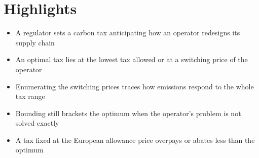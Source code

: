 \documentclass[11pt]{article}
\begin{document}
\section*{Highlights}
\begin{itemize}
\item A regulator sets a carbon tax anticipating how an operator redesigns its supply chain
\item An optimal tax lies at the lowest tax allowed or at a switching price of the operator
\item Enumerating the switching prices traces how emissions respond to the whole tax range
\item Bounding still brackets the optimum when the operator's problem is not solved exactly
\item A tax fixed at the European allowance price overpays or abates less than the optimum
\end{itemize}
\end{document}

